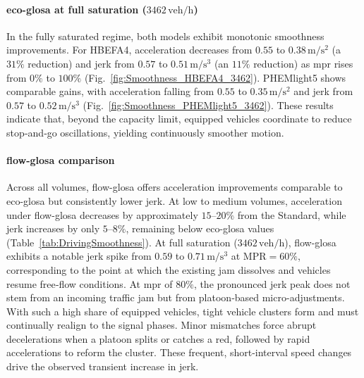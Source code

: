 \paragraph{\ac{eco-glosa} at full saturation ($3462\,\mathrm{veh/h}$)}
In the fully saturated regime, both models exhibit monotonic smoothness improvements. For HBEFA4, acceleration decreases from $0.55$ to $0.38\,\mathrm{m/s^2}$ (a $31\%$ reduction) and jerk from $0.57$ to $0.51\,\mathrm{m/s^3}$ (an $11\%$ reduction) as \ac{mpr} rises from $0\%$ to $100\%$ (Fig.~\ref{fig:Smoothness_HBEFA4_3462}). PHEMlight5 shows comparable gains, with acceleration falling from $0.55$ to $0.35\,\mathrm{m/s^2}$ and jerk from $0.57$ to $0.52\,\mathrm{m/s^3}$ (Fig.~\ref{fig:Smoothness_PHEMlight5_3462}). These results indicate that, beyond the capacity limit, equipped vehicles coordinate to reduce stop‐and‐go oscillations, yielding continuously smoother motion.

\paragraph{\ac{flow-glosa} comparison}
Across all volumes, \ac{flow-glosa} offers acceleration improvements comparable to \ac{eco-glosa} but consistently lower jerk. At low to medium volumes, acceleration under \ac{flow-glosa} decreases by approximately $15$–$20\%$ from the Standard, while jerk increases by only $5$–$8\%$, remaining below \ac{eco-glosa} values (Table~\ref{tab:DrivingSmoothness}). At full saturation ($3462\,\mathrm{veh/h}$), \ac{flow-glosa} exhibits a notable jerk spike from $0.59$ to $0.71\,\mathrm{m/s^3}$ at $\mathrm{MPR}=60\%$, corresponding to the point at which the existing jam dissolves and vehicles resume free‐flow conditions. At \ac{mpr} of $80\%$, the pronounced jerk peak does not stem from an incoming traffic jam but from platoon‐based micro-adjustments. With such a high share of equipped vehicles, tight vehicle clusters form and must continually realign to the signal phases. Minor mismatches force abrupt decelerations when a platoon splits or catches a red, followed by rapid accelerations to reform the cluster. These frequent, short-interval speed changes drive the observed transient increase in jerk.

